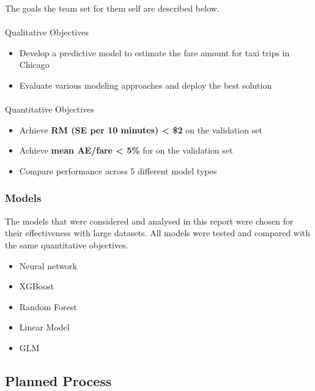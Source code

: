 \documentclass[
  letterpaper,
  DIV=11,
  numbers=noendperiod]{scrartcl}
\makeatletter
\let\oldparagraph\paragraph
\renewcommand{\paragraph}{
    \@ifstar
      \xxxParagraphStar
      \xxxParagraphNoStar
  }
\newcommand{\xxxParagraphStar}[1]{\oldparagraph*{#1}\mbox{}}
\newcommand{\xxxParagraphNoStar}[1]{\oldparagraph{#1}\mbox{}}
\makeatother
\begin{document}
The goals the team set for them self are described below.

\paragraph{Qualitative Objectives}\label{qualitative-objectives}

\begin{itemize}
\item
  Develop a predictive model to estimate the fare amount for taxi trips
  in Chicago
\item
  Evaluate various modeling approaches and deploy the best solution
\end{itemize}

\paragraph{Quantitative Objectives}\label{quantitative-objectives}

\begin{itemize}
\item
  Achieve \textbf{RM (SE per 10 minutes) \textless{} \$2} on the
  validation set
\item
  Achieve \textbf{mean AE/fare \textless{} 5\%} for on the validation
  set
\item
  Compare performance across 5 different model types
\end{itemize}

\subsubsection{Models}\label{models}

The models that were considered and analysed in this report were chosen
for their effectiveness with large datasets. All models were tested and
compared with the same quantitative objectives.

\begin{itemize}
\item
  Neural network
\item
  XGBoost
\item
  Random Forest
\item
  Linear Model
\item
  GLM
\end{itemize}

\newpage

\subsection{Planned Process}\label{planned-process}
\end{document}
